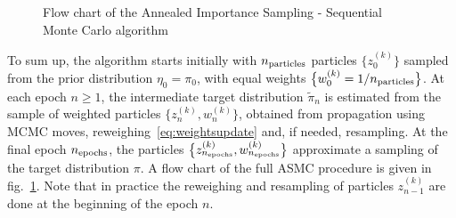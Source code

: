 \documentclass[11pt,a4paper]{article}
\begin{document}
\begin{figure}[h!]
\begin{minipage}{15cm}
\begin{tcolorbox}
				\end{tcolorbox}
			\end{minipage}
			\caption{Flow chart of the Annealed Importance Sampling - Sequential Monte Carlo algorithm}
			\label{ASMCflowchart}
		\end{figure}

	To sum up, the algorithm starts initially with $n_{\rm particles}$ particles $\big\{z^{(k)}_{0}\big\}$ sampled from the prior distribution $\eta_{0}=\pi_{0}$, with equal weights $\big\{w^{(k)}_{0} = 1/n_{\rm particles}\big\}$. At each epoch $n\geq1$, the intermediate target distribution $\tilde{\pi}_{n}$ is estimated from the sample of weighted particles $\big\{z^{(k)}_{n}, w^{(k)}_{n}\big\}$, obtained from propagation using MCMC moves, reweighing~\eqref{eq:weightsupdate} and, if needed, resampling. At the final epoch $n_{\rm epochs}$, the particles $\big\{z^{(k)}_{n_{\rm epochs}}, w^{(k)}_{n_{\rm epochs}}\big\}$ approximate a sampling of the target distribution $\pi$. A flow chart of the full ASMC procedure is given in fig.~\ref{ASMCflowchart}. Note that in practice the reweighing and resampling of particles $z_{n-1}^{(k)}$ are done at the beginning of the epoch $n$.
\end{document}
